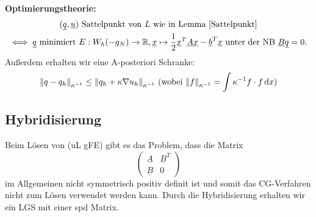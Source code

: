 \textbf{Optimierungstheorie:} 
\begin{gather*}
	(\underline{q}, \underline{u}) \text{ Sattelpunkt von } L  \text { wie in Lemma \ref{Sattelpunkt}}\\
	\iff \underline{q} \text{ minimiert } E:W_h(-g_N) \to \mathbb{R} , \underline{x} \mapsto \frac{1}{2} \underline{x}^T \underline{A} \underline{x} - \underline{b}^T \underline{x} \text{ unter der NB } \underline{B} \underline{q} = 0.
\end{gather*}
Außerdem erhalten wir eine A-posteriori Schranke:
\[ \norm{q-q_h}_{\kappa^{-1}} \leq \norm{q_h + \kappa \nabla u_h}_{\kappa^{-1}} \ (\text{wobei } \norm{f}_{\kappa^{-1}} = \int \kappa^{-1} f \cdot f \mathop{}\!\mathrm{d} x)  \]

\subsection{Hybridisierung}

Beim Lösen von (uL gFE) gibt es das Problem, dass die Matrix \[ \begin{pmatrix}
\underline{A} &\underline{B}^T\\
\underline{B} &0
\end{pmatrix} \] im Allgemeinen nicht symmetrisch positiv definit ist und somit das CG-Verfahren nicht zum Lösen verwendet werden kann. Durch die Hybridisierung erhalten wir ein LGS mit einer spd Matrix.

